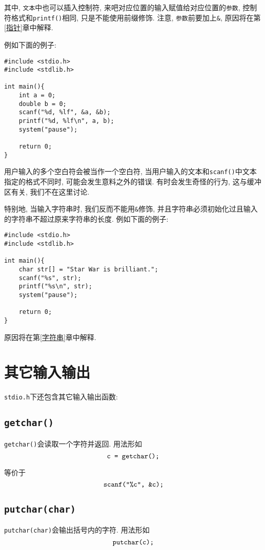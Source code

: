             其中, \texttt{文本}中也可以插入控制符, 来吧对应位置的输入赋值给对应位置的\texttt{参数}, 控制符格式和\texttt{printf()}相同, 只是不能使用前缀修饰. 注意, \texttt{参数}前要加上\texttt{\&}, 原因将在第\ref{指针}章中解释.

            例如下面的例子:
\begin{lstlisting}
#include <stdio.h>
#include <stdlib.h>

int main(){
    int a = 0;
    double b = 0;
    scanf("%d, %lf", &a, &b);
    printf("%d, %lf\n", a, b);
    system("pause");

    return 0;
}
\end{lstlisting}

            用户输入的多个空白符会被当作一个空白符, 当用户输入的文本和\texttt{scanf()}中文本指定的格式不同时, 可能会发生意料之外的错误. 有时会发生奇怪的行为, 这与缓冲区有关, 我们不在这里讨论.

            特别地, 当输入字符串时, 我们反而不能用\texttt{\&}修饰, 并且字符串必须初始化过且输入的字符串不超过原来字符串的长度. 例如下面的例子:
\begin{lstlisting}
#include <stdio.h>
#include <stdlib.h>

int main(){
    char str[] = "Star War is brilliant.";
    scanf("%s", str);
    printf("%s\n", str);
    system("pause");

    return 0;
}
\end{lstlisting}

            原因将在第\ref{字符串}章中解释.

    \section{其它输入输出}
        \texttt{stdio.h}下还包含其它输入输出函数:

        \subsection*{\texttt{getchar()}}
            \texttt{getchar()}会读取一个字符并返回. 用法形如
                \[ \mbox{\texttt{c = getchar();}} \]
            
            等价于
                \[ \mbox{\texttt{scanf("\%c", \&c);}} \]  

        \subsection*{\texttt{putchar(char)}}
            \texttt{putchar(char)}会输出括号内的字符. 用法形如
                \[ \mbox{\texttt{putchar(c);}} \]

